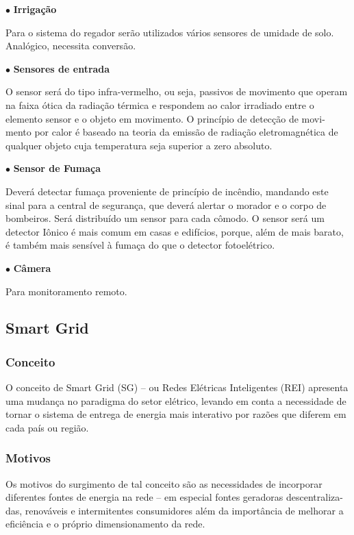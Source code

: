 $\bullet$ \textbf{Irrigação}

	Para o sistema do regador serão utilizados vários sensores de umidade de solo. Analógico, necessita conversão.
	
$\bullet$ \textbf{Sensores de entrada}

	O sensor será do tipo infra-vermelho, ou seja, passivos de movimento que operam na faixa ótica da radiação térmica e respondem ao calor irradiado entre o elemento sensor e o objeto em movimento. O princípio de detecção de movi- mento por calor é baseado na teoria da emissão de radiação eletromagnética de qualquer objeto cuja temperatura seja superior a zero absoluto.

$\bullet$ \textbf{Sensor de Fumaça}

	Deverá detectar fumaça proveniente de princípio de incêndio, mandando este sinal para a central de segurança, que deverá alertar o morador e o corpo de bombeiros. Será distribuído um sensor para cada cômodo. O sensor será um detector Iônico é mais comum em casas e edifícios, porque, além de mais barato, é também mais sensível à fumaça do que o detector fotoelétrico.

$\bullet$ \textbf{Câmera}

	Para monitoramento remoto.

\subsection{Smart Grid}
\subsubsection{Conceito}

	O conceito de Smart Grid (SG) – ou Redes Elétricas Inteligentes (REI) apresenta uma mudança no paradigma do setor elétrico, levando em conta a necessidade de tornar o sistema de entrega de energia mais interativo por razões que diferem em cada país ou região.

\subsubsection{Motivos}

	Os motivos do surgimento de tal conceito são as necessidades de incorporar diferentes fontes de energia na rede – em especial fontes geradoras descentraliza- das, renováveis e intermitentes consumidores além da importância de melhorar a eficiência e o próprio dimensionamento da rede.


